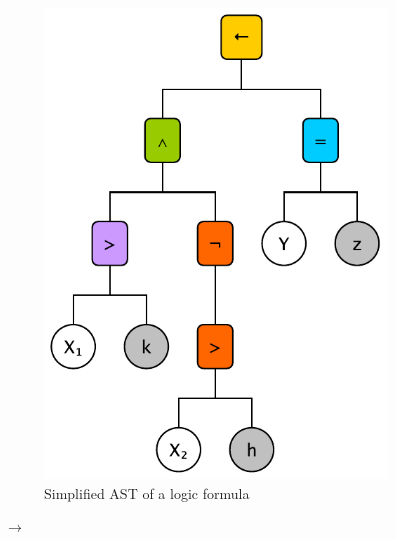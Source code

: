 \begin{figure}
\begin{subfigure}[]{0.3\linewidth}
        \includegraphics[scale=\astscale]{figures/ast-simplified}
        \caption{Simplified AST of a logic formula}
        \label{fig:ast-simplified}
    \end{subfigure}
    $\rightarrow$
    \begin{subfigure}[]{0.3\linewidth}
        \centering

\end{subfigure}
\end{figure}
